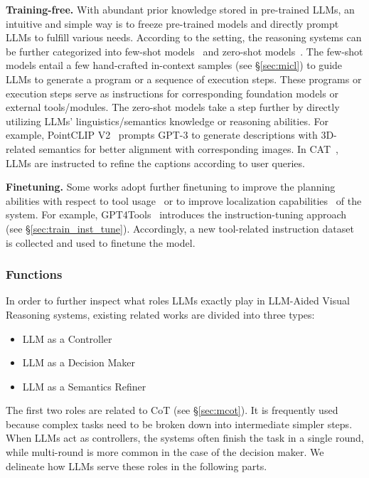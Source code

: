 \noindent \textbf{Training-free.}
With abundant prior knowledge stored in pre-trained LLMs, an intuitive and simple way is to freeze pre-trained models and directly prompt LLMs to fulfill various needs. 
According to the setting, the reasoning systems can be further categorized into few-shot models~\cite{chameleon, HuggingGPT, mm-react, visprog} and zero-shot models~\cite{PointCLIP-V2,CAT}. 
The few-shot models entail a few hand-crafted in-context samples (see \S \ref{sec:micl}) to guide LLMs to generate a program or a sequence of execution steps. 
These programs or execution steps serve as instructions for corresponding foundation models or external tools/modules. 
The zero-shot models take a step further by directly utilizing LLMs' linguistics/semantics knowledge or reasoning abilities. 
For example, PointCLIP V2~\cite{PointCLIP-V2} prompts GPT-3 to generate descriptions with 3D-related semantics for better alignment with corresponding images. 
In CAT~\cite{CAT}, LLMs are instructed to refine the captions according to user queries.


\noindent \textbf{Finetuning.}
Some works adopt further finetuning to improve the planning abilities with respect to tool usage~\cite{gpt4tools} or to improve localization capabilities~\cite{lai2023lisa,wu2023textit} of the system. For example, GPT4Tools~\cite{gpt4tools} introduces the instruction-tuning approach (see \S \ref{sec:train_inst_tune}). 
Accordingly, a new tool-related instruction dataset is collected and used to finetune the model.


\subsubsection{Functions}
\label{sec:vr_func}
In order to further inspect what roles LLMs exactly play in LLM-Aided Visual Reasoning systems, existing related works are divided into three types:
\begin{itemize}
    \item LLM as a Controller
    \item LLM as a Decision Maker
    \item LLM as a Semantics Refiner
\end{itemize}

The first two roles are related to CoT (see \S \ref{sec:mcot}). It is frequently used because complex tasks need to be broken down into intermediate simpler steps. 
When LLMs act as controllers, the systems often finish the task in a single round, while multi-round is more common in the case of the decision maker.
We delineate how LLMs serve these roles in the following parts.

